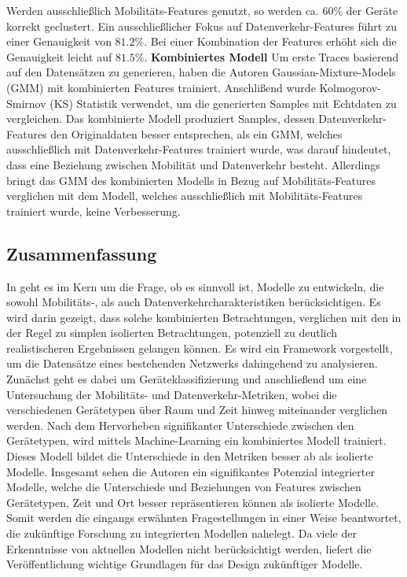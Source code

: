 \documentclass[12pt, a4paper]{article}
\begin{document}
Werden ausschließlich Mobilitäts-Features genutzt, so werden ca. $60 \%$ der Geräte korrekt geclustert.
Ein ausschließlicher Fokus auf Datenverkehr-Features führt zu einer Genauigkeit von $81.2 \%$.
Bei einer Kombination der Features erhöht sich die Genauigkeit leicht auf $81.5 \%$.
\newline\newline
\textbf{Kombiniertes Modell}\newline
Um erste Traces basierend auf den Datensätzen zu generieren, haben die Autoren Gaussian-Mixture-Models (GMM) mit
kombinierten Features trainiert. Anschlißend wurde Kolmogorov-Smirnov (KS) Statistik verwendet, um die generierten
Samples mit Echtdaten zu vergleichen. Das kombinierte Modell produziert Samples, dessen Datenverkehr-Features
den Originaldaten besser entsprechen, als ein GMM, welches ausschließlich mit Datenverkehr-Features trainiert wurde,
was darauf hindeutet, dass eine Beziehung zwischen Mobilität und Datenverkehr besteht. 
Allerdings bringt das GMM des kombinierten Modells in Bezug auf Mobilitäts-Features verglichen mit
dem Modell, welches ausschließlich mit Mobilitäts-Features trainiert wurde, keine Verbesserung.

\subsection{Zusammenfassung}
\label{sec:summary}

In \cite{Alipour2018} geht es im Kern um die Frage, ob es sinnvoll ist, Modelle zu entwickeln, die sowohl
Mobilitäts-, als auch Datenverkehrcharakteristiken berücksichtigen. Es wird darin gezeigt, dass solche
kombinierten Betrachtungen, verglichen mit den in der Regel zu simplen isolierten Betrachtungen, potenziell zu
deutlich realistischeren Ergebnissen gelangen können.
Es wird ein Framework vorgestellt, um die Datensätze eines bestehenden Netzwerks dahingehend zu analysieren.
Zunächst geht es dabei um Geräteklassifizierung und anschließend um eine Untersuchung der Mobilitäts-
und Datenverkehr-Metriken, wobei die verschiedenen Gerätetypen über Raum und Zeit hinweg miteinander verglichen werden.
Nach dem Hervorheben signifikanter Unterschiede zwischen den Gerätetypen, wird mittels Machine-Learning ein kombiniertes Modell
trainiert. Dieses Modell bildet die Unterschiede in den Metriken besser ab als isolierte Modelle.
Insgesamt sehen die Autoren ein signifikantes Potenzial integrierter Modelle, welche die Unterschiede und Beziehungen 
von Features zwischen Gerätetypen, Zeit und Ort besser repräsentieren können als isolierte Modelle. 
Somit werden die eingangs erwähnten Fragestellungen in einer Weise beantwortet, die zukünftige Forschung zu
integrierten Modellen nahelegt. Da viele der Erkenntnisse von aktuellen Modellen nicht berücksichtigt werden, 
liefert die Veröffentlichung wichtige Grundlagen für das Design zukünftiger Modelle.
\end{document}
